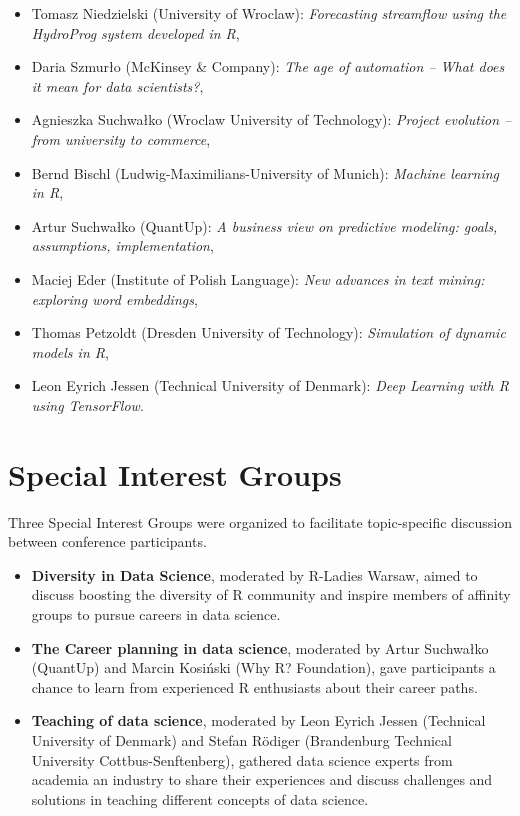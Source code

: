 \begin{itemize}
    \item Tomasz Niedzielski (University of Wroclaw):  \textit{Forecasting streamflow using the HydroProg system developed in R},
    \item Daria Szmur\l{}o (McKinsey \& Company): \textit{The age of automation -- What does it mean for data scientists?},
    \item Agnieszka Suchwa\l{}ko (Wroclaw University of Technology): \textit{Project evolution -- from university to commerce},
    \item Bernd Bischl (Ludwig-Maximilians-University of Munich): \textit{Machine learning in R},
    \item Artur Suchwa\l{}ko (QuantUp): \textit{A business view on predictive modeling: goals, assumptions, implementation},
    \item Maciej Eder (Institute of Polish Language): \textit{New advances in text mining: exploring word embeddings},
    \item Thomas Petzoldt (Dresden University of Technology): \textit{Simulation of dynamic models in R},
    \item Leon Eyrich Jessen (Technical University of Denmark): \textit{Deep Learning with R using TensorFlow}.
\end{itemize}


\section{Special Interest Groups}

Three Special Interest Groups were organized to facilitate topic-specific discussion between conference participants.

\begin{itemize}
\item  \textbf{Diversity in Data Science}, moderated by R-Ladies Warsaw, aimed to discuss boosting the diversity of R community and inspire members of affinity groups to pursue careers in data science. 
\item \textbf{The Career planning in data science}, moderated by Artur Suchwa\l{}ko (QuantUp) and Marcin Kosi\'n{}ski (Why R? Foundation), gave participants a chance to learn from experienced R enthusiasts about their career paths. 
\item \textbf{Teaching of data science}, moderated by Leon Eyrich Jessen (Technical University of Denmark) and Stefan R\"odiger (Brandenburg Technical University Cottbus-Senftenberg), gathered data science experts from academia an industry  to share their experiences and discuss challenges and solutions in teaching different concepts of data science. 
\end{itemize}

